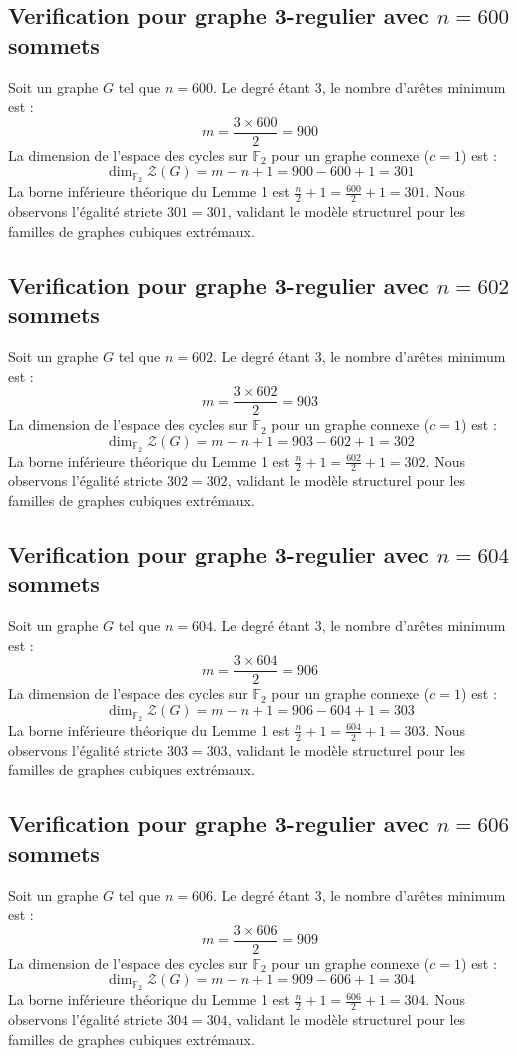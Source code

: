 \documentclass[11pt,a4paper]{article}
\begin{document}
\subsection{Verification pour graphe 3-regulier avec $n=600$ sommets}
Soit un graphe $G$ tel que $n = 600$. Le degré étant 3, le nombre d'arêtes minimum est :
$$ m = \frac{3 \times 600}{2} = 900 $$
La dimension de l'espace des cycles sur $\mathbb{F}_2$ pour un graphe connexe ($c=1$) est :
$$ \dim_{\mathbb{F}_2} \mathcal{Z}(G) = m - n + 1 = 900 - 600 + 1 = 301 $$
La borne inférieure théorique du Lemme 1 est $\frac{n}{2} + 1 = \frac{600}{2} + 1 = 301$.
Nous observons l'égalité stricte $301 = 301$, validant le modèle structurel pour les familles de graphes cubiques extrémaux.

\subsection{Verification pour graphe 3-regulier avec $n=602$ sommets}
Soit un graphe $G$ tel que $n = 602$. Le degré étant 3, le nombre d'arêtes minimum est :
$$ m = \frac{3 \times 602}{2} = 903 $$
La dimension de l'espace des cycles sur $\mathbb{F}_2$ pour un graphe connexe ($c=1$) est :
$$ \dim_{\mathbb{F}_2} \mathcal{Z}(G) = m - n + 1 = 903 - 602 + 1 = 302 $$
La borne inférieure théorique du Lemme 1 est $\frac{n}{2} + 1 = \frac{602}{2} + 1 = 302$.
Nous observons l'égalité stricte $302 = 302$, validant le modèle structurel pour les familles de graphes cubiques extrémaux.

\subsection{Verification pour graphe 3-regulier avec $n=604$ sommets}
Soit un graphe $G$ tel que $n = 604$. Le degré étant 3, le nombre d'arêtes minimum est :
$$ m = \frac{3 \times 604}{2} = 906 $$
La dimension de l'espace des cycles sur $\mathbb{F}_2$ pour un graphe connexe ($c=1$) est :
$$ \dim_{\mathbb{F}_2} \mathcal{Z}(G) = m - n + 1 = 906 - 604 + 1 = 303 $$
La borne inférieure théorique du Lemme 1 est $\frac{n}{2} + 1 = \frac{604}{2} + 1 = 303$.
Nous observons l'égalité stricte $303 = 303$, validant le modèle structurel pour les familles de graphes cubiques extrémaux.

\subsection{Verification pour graphe 3-regulier avec $n=606$ sommets}
Soit un graphe $G$ tel que $n = 606$. Le degré étant 3, le nombre d'arêtes minimum est :
$$ m = \frac{3 \times 606}{2} = 909 $$
La dimension de l'espace des cycles sur $\mathbb{F}_2$ pour un graphe connexe ($c=1$) est :
$$ \dim_{\mathbb{F}_2} \mathcal{Z}(G) = m - n + 1 = 909 - 606 + 1 = 304 $$
La borne inférieure théorique du Lemme 1 est $\frac{n}{2} + 1 = \frac{606}{2} + 1 = 304$.
Nous observons l'égalité stricte $304 = 304$, validant le modèle structurel pour les familles de graphes cubiques extrémaux.
\end{document}
